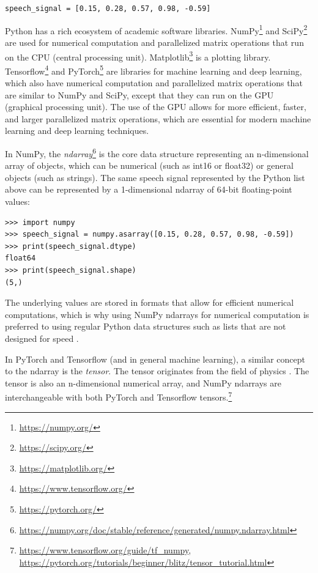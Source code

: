 \documentclass[report.tex]{subfiles}
\begin{document}
\hfill \Verb#speech_signal = [0.15, 0.28, 0.57, 0.98, -0.59]#

Python has a rich ecosystem of academic software libraries. NumPy\footnote{\url{https://numpy.org/}} and SciPy\footnote{\url{https://scipy.org/}} are used for numerical computation and parallelized matrix operations that run on the CPU (central processing unit). Matplotlib\footnote{\url{https://matplotlib.org/}} is a plotting library. Tensorflow\footnote{\url{https://www.tensorflow.org/}} and PyTorch\footnote{\url{https://pytorch.org/}} are libraries for machine learning and deep learning, which also have numerical computation and parallelized matrix operations that are similar to NumPy and SciPy, except that they can run on the GPU (graphical processing unit). The use of the GPU allows for more efficient, faster, and larger parallelized matrix operations, which are essential for modern machine learning and deep learning techniques.

In NumPy, the \textit{ndarray}\footnote{\url{https://numpy.org/doc/stable/reference/generated/numpy.ndarray.html}} is the core data structure representing an n-dimensional array of objects, which can be numerical (such as int16 or float32) or general objects (such as strings). The same speech signal represented by the Python list above can be represented by a 1-dimensional ndarray of 64-bit floating-point values:

\begin{listing}[!ht]
\centering
\begin{BVerbatim}
>>> import numpy
>>> speech_signal = numpy.asarray([0.15, 0.28, 0.57, 0.98, -0.59])
>>> print(speech_signal.dtype)
float64
>>> print(speech_signal.shape)
(5,)
\end{BVerbatim}
\end{listing}

The underlying values are stored in formats that allow for efficient numerical computations, which is why using NumPy ndarrays for numerical computation is preferred to using regular Python data structures such as lists that are not designed for speed \parencite{ndarrayfast}.

In PyTorch and Tensorflow (and in general machine learning), a similar concept to the ndarray is the \textit{tensor}. The tensor originates from the field of physics \parencite{whatistensor}. The tensor is also an n-dimensional numerical array, and NumPy ndarrays are interchangeable with both PyTorch and Tensorflow tensors.\footnote{\url{https://www.tensorflow.org/guide/tf_numpy}, \url{https://pytorch.org/tutorials/beginner/blitz/tensor_tutorial.html}}
\end{document}
